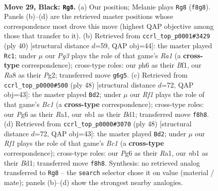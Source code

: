 \documentclass[11pt]{article}
\begin{document}
\clearpage

\begin{figure}[p]\centering
\begin{subfigure}{0.46\textwidth}\centering
\resizebox{\linewidth}{!}{%
\newchessgame
\chessboard[
  setfen={rn1k1r2/1p2bb1p/6pP/p2pPp2/P2N4/6P1/1B4K1/RN3R2 b - - 2 29},
  showmover=false,
  pgfstyle=straightmove, color=movearrow, markmove={f8-g8}
]}
\caption{}
\end{subfigure}\hfill
\begin{subfigure}{0.46\textwidth}\centering
\resizebox{\linewidth}{!}{%
\newchessgame
\chessboard[
  setfen={r2r2k1/1p3ppp/4b3/3n4/8/P3P3/1B1K1PPP/R4B1R w - - 1 21},
  showmover=false,
  pgfstyle=straightmove, color=movearrow, markmove={a1-c1}
]}
\caption{}
\end{subfigure}
\\[4pt]
\begin{subfigure}{0.46\textwidth}\centering
\resizebox{\linewidth}{!}{%
\newchessgame
\chessboard[
  setfen={r4rk1/1b3p2/1p6/4p1Pp/3nP2P/8/PP6/R1BB1RK1 w - - 3 25},
  showmover=false,
  pgfstyle=straightmove, color=movearrow, markmove={c1-d2}
]}
\caption{}
\end{subfigure}\hfill
\begin{subfigure}{0.46\textwidth}\centering
\resizebox{\linewidth}{!}{%
\newchessgame
\chessboard[
  setfen={r4rk1/1b3p2/1p6/4p1Pp/3nP2P/8/PP6/R1BB1RK1 w - - 3 25},
  showmover=false,
  pgfstyle=straightmove, color=movearrow, markmove={c1-d2}
]}
\caption{}
\end{subfigure}
\caption{\textbf{Move 29, Black: \texttt{Rg8}.} (a) Our position; Melanie plays \texttt{Rg8} (\texttt{f8g8}). Panels (b)--(d) are the retrieved master positions whose correspondence most drove this move (highest QAP objective among those that transfer to it). (b) Retrieved from \texttt{ccrl\_top\_p0001\#3429} (ply 40) [structural distance $d$=59, QAP obj=44]: the master played \texttt{Rc1}; under $\mu$ our \emph{Pg3} plays the role of that game's \emph{Ra1} (a \textbf{cross-type} correspondence); cross-type roles: our \emph{p}h6 as their \emph{B}f1, our \emph{R}a8 as their \emph{P}g2; transferred move \texttt{g6g5}. (c) Retrieved from \texttt{ccrl\_top\_p0000\#500} (ply 48) [structural distance $d$=72, QAP obj=43]: the master played \texttt{Bd2}; under $\mu$ our \emph{Rf1} plays the role of that game's \emph{Bc1} (a \textbf{cross-type} correspondence); cross-type roles: our \emph{P}g6 as their \emph{R}a1, our \emph{n}b1 as their \emph{B}d1; transferred move \texttt{f8h8}. (d) Retrieved from \texttt{ccrl\_top\_p0000\#3070} (ply 48) [structural distance $d$=72, QAP obj=43]: the master played \texttt{Bd2}; under $\mu$ our \emph{Rf1} plays the role of that game's \emph{Bc1} (a \textbf{cross-type} correspondence); cross-type roles: our \emph{P}g6 as their \emph{R}a1, our \emph{n}b1 as their \emph{B}d1; transferred move \texttt{f8h8}. Synthesis: no retrieved analog transferred to \texttt{Rg8} -- the \texttt{search} selector chose it on value (material / mate); panels (b)--(d) show the strongest nearby analogies.}
\label{fig:thought-m57}
\end{figure}
\end{document}
